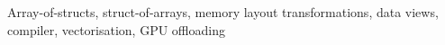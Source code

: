 \documentclass[runningheads]{llncs}
\begin{document}
\maketitle

\begin{abstract}
  
\end{abstract}

\begin{keywords}
  Array-of-structs, struct-of-arrays, memory layout transformations, data views,
  compiler, vectorisation, GPU offloading
\end{keywords}

% 















\newpage

\appendix

%



\end{document}
